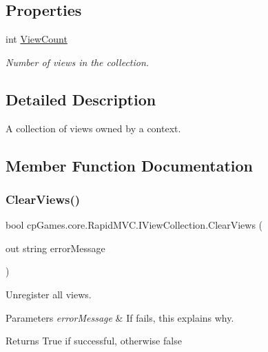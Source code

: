 \subsection*{Properties}
\begin{DoxyCompactItemize}
\item 
int \mbox{\hyperlink{interfacecp_games_1_1core_1_1_rapid_m_v_c_1_1_i_view_collection_a9946bcf9c5c23283b3f21fea41689aca}{View\+Count}}
\begin{DoxyCompactList}\small\item\em Number of views in the collection. \end{DoxyCompactList}\end{DoxyCompactItemize}


\subsection{Detailed Description}
A collection of views owned by a context. 



\subsection{Member Function Documentation}
\mbox{\label{interfacecp_games_1_1core_1_1_rapid_m_v_c_1_1_i_view_collection_ab7631908f42053edeb586ac79ffbb2c0}} 
\subsubsection{\texorpdfstring{ClearViews()}{ClearViews()}}
{\footnotesize\ttfamily bool cp\+Games.\+core.\+Rapid\+M\+V\+C.\+I\+View\+Collection.\+Clear\+Views (\begin{DoxyParamCaption}\item[{out string}]{error\+Message }\end{DoxyParamCaption})}



Unregister all views. 


\begin{DoxyParams}{Parameters}
{\em error\+Message} & If fails, this explains why.\\
\hline
\end{DoxyParams}
\begin{DoxyReturn}{Returns}
True if successful, otherwise false
\end{DoxyReturn}


